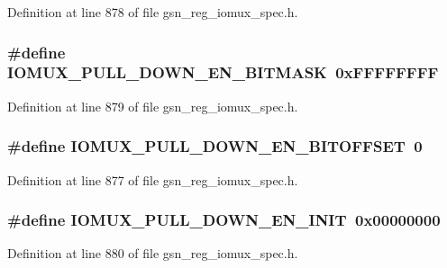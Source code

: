 Definition at line 878 of file gsn\_\-reg\_\-iomux\_\-spec.h.

\hypertarget{a00560_a581011ceb3ff37d6cfd0cbbe0206ea40}{
\subsubsection[{IOMUX\_\-PULL\_\-DOWN\_\-EN\_\-BITMASK}]{\setlength{\rightskip}{0pt plus 5cm}\#define IOMUX\_\-PULL\_\-DOWN\_\-EN\_\-BITMASK~0xFFFFFFFF}}
\label{a00560_a581011ceb3ff37d6cfd0cbbe0206ea40}


Definition at line 879 of file gsn\_\-reg\_\-iomux\_\-spec.h.

\hypertarget{a00560_a09a83a3e51e16afaf5e68bf7ad43ba6b}{
\subsubsection[{IOMUX\_\-PULL\_\-DOWN\_\-EN\_\-BITOFFSET}]{\setlength{\rightskip}{0pt plus 5cm}\#define IOMUX\_\-PULL\_\-DOWN\_\-EN\_\-BITOFFSET~0}}
\label{a00560_a09a83a3e51e16afaf5e68bf7ad43ba6b}


Definition at line 877 of file gsn\_\-reg\_\-iomux\_\-spec.h.

\hypertarget{a00560_aa673ff477c0fe142ea5a9fc008566369}{
\subsubsection[{IOMUX\_\-PULL\_\-DOWN\_\-EN\_\-INIT}]{\setlength{\rightskip}{0pt plus 5cm}\#define IOMUX\_\-PULL\_\-DOWN\_\-EN\_\-INIT~0x00000000}}
\label{a00560_aa673ff477c0fe142ea5a9fc008566369}


Definition at line 880 of file gsn\_\-reg\_\-iomux\_\-spec.h.

